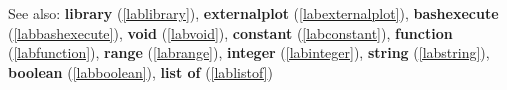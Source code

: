 See also: \textbf{library} (\ref{lablibrary}), \textbf{externalplot} (\ref{labexternalplot}), \textbf{bashexecute} (\ref{labbashexecute}), \textbf{void} (\ref{labvoid}), \textbf{constant} (\ref{labconstant}), \textbf{function} (\ref{labfunction}), \textbf{range} (\ref{labrange}), \textbf{integer} (\ref{labinteger}), \textbf{string} (\ref{labstring}), \textbf{boolean} (\ref{labboolean}), \textbf{list of} (\ref{lablistof})
